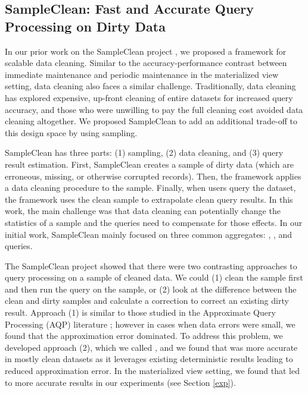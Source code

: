 \subsection{SampleClean: Fast and Accurate Query Processing on Dirty Data}
In our prior work on the SampleClean project \cite{wang1999sample}, we proposed a framework for scalable data cleaning.
Similar to the accuracy-performance contrast between immediate maintenance and periodic maintenance in the materialized view setting, data cleaning also faces a similar challenge.
Traditionally, data cleaning has explored expensive, up-front cleaning of entire datasets for increased query accuracy, and those who were unwilling to pay the full cleaning cost avoided data cleaning altogether.
We proposed SampleClean to add an additional trade-off to this design space by using sampling.

SampleClean has three parts: (1) sampling, (2) data cleaning, and (3) query result estimation.
First, SampleClean creates a sample of dirty data (which are erroneous, missing, or otherwise corrupted records).
Then, the framework applies a data cleaning procedure to the sample.
Finally, when users query the dataset, the framework uses the clean sample to extrapolate clean query results.
In this work, the main challenge was that data cleaning can potentially change the statistics of a sample and the queries need to compensate for those effects.
In our initial work, SampleClean mainly focused on three common aggregates: \sumfunc, \avgfunc, and \countfunc queries.

The SampleClean project showed that there were two contrasting approaches to query processing on a sample of cleaned data.
We could (1) clean the sample first and then run the query on the sample, or (2) look at the difference between the clean and dirty samples and calculate a correction to correct an existing dirty result. 
Approach (1) is similar to those studied in the Approximate Query Processing (AQP) literature \cite{OlkenR86,AgarwalMPMMS13, joshi2008materialized}; however in cases when data errors were small, we found that the approximation error dominated.
To address this problem, we developed approach (2), which we called \nsc, and we found that \nsc was more accurate in mostly clean datasets as it leverages existing deterministic results leading to reduced approximation error.
In the materialized view setting, we found that \nsc led to more accurate results in our experiments (see Section \ref{exp}). 


